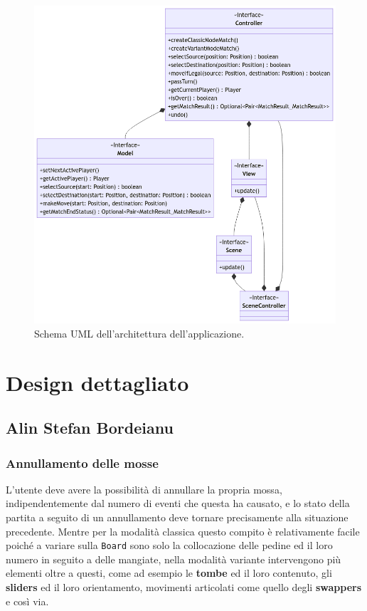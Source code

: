 \documentclass[a4paper,12pt]{report}
\begin{document}
\begin{figure}[H]
\centering
\includegraphics[width=\textwidth]{images/architecture.png}
\caption{Schema UML dell'architettura dell'applicazione.}
\label{images:architecture}
\end{figure}


\section{Design dettagliato}

\subsection{Alin Stefan Bordeianu}

\subsubsection{Annullamento delle mosse}

L'utente deve avere la possibilità di annullare la propria mossa, indipendentemente dal numero di eventi che questa ha causato, e lo stato della partita a seguito di un annullamento deve tornare precisamente alla situazione precedente. Mentre per la modalità classica questo compito è relativamente facile poiché a variare sulla \texttt{Board} sono solo la collocazione delle pedine ed il loro numero in seguito a delle mangiate, nella modalità variante intervengono più elementi oltre a questi, come ad esempio le \textbf{tombe} ed il loro contenuto, gli \textbf{sliders} ed il loro orientamento, movimenti articolati come quello degli \textbf{swappers} e così via.
\end{document}
